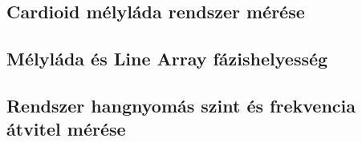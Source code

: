 \subsection{Cardioid mélyláda rendszer mérése}



\subsection{Mélyláda és Line Array fázishelyesség}



\subsection{Rendszer hangnyomás szint és frekvencia átvitel mérése}







